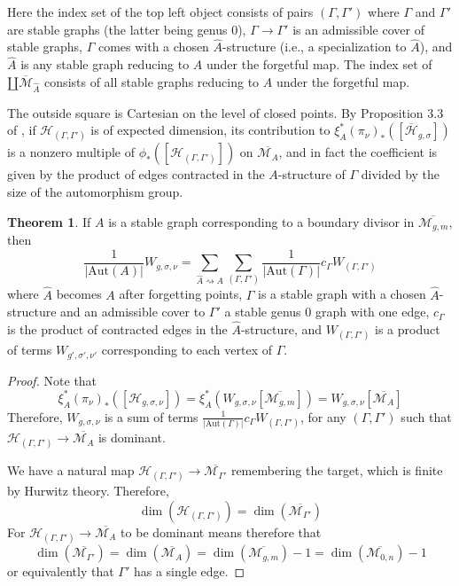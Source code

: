 \documentclass[11pt]{article}           %
\newcommand{\Aut}{\text{Aut}}
\newcommand{\Hb}{\overline{\mathcal H}}
\theoremstyle{definition}
\newtheorem{thm}{Theorem}[section]
\begin{document}
Here the index set of the top left object
consists of pairs $(\Gamma,\Gamma')$
where $\Gamma$ and $\Gamma'$ are stable graphs (the latter being genus $0$), $\Gamma\to\Gamma'$ is an admissible cover of stable graphs, $\Gamma$
comes with a chosen $\hat A$-structure (i.e., a specialization to $\hat A$),
and $\hat A$ is any stable graph reducing to $A$ under the forgetful map.
The index set of $\amalg\overline{\mathcal M}_{\hat A}$ consists of
all stable graphs reducing to $A$ under the forgetful map.

The outside square is Cartesian on the level of closed points. By
Proposition 3.3 of \cite{Lian}, if $\mathcal H_{(\Gamma,\Gamma')}$ is of
expected dimension, its contribution to $\xi_A^*(\pi_{\nu})_*([\Hb_{g,\sigma}])$
is a nonzero multiple of $\phi_*([\mathcal H_{(\Gamma,\Gamma')}])$ on $\overline{\mathcal M_A}$, and in fact the coefficient is given by the product of edges contracted in the $A$-structure of $\Gamma$ divided by the size of the automorphism group.%

\begin{thm}
  \label{thm:admissible}
  If $A$ is a stable graph corresponding to a boundary divisor in $\overline{\mathcal M_{g,m}}$, then
  \[
  \frac 1{|\Aut(A)|}W_{g,\sigma,\nu}=\sum_{\hat A\rightsquigarrow A}\sum_{(\Gamma,\Gamma')}\frac 1{|\Aut(\Gamma)|}c_{\Gamma}W_{(\Gamma,\Gamma')}
  \]
  where $\hat A$ becomes $A$ after forgetting points, $\Gamma$ is a stable graph with a chosen $\hat A$-structure and an admissible
  cover to $\Gamma'$ a stable genus $0$ graph with one edge, $c_{\Gamma}$ is the
  product of contracted edges in the $\hat A$-structure, and
  $W_{(\Gamma,\Gamma')}$ is a product of terms $W_{g',\sigma',\nu'}$ corresponding to each vertex of $\Gamma$.
\end{thm}

\begin{proof}
  Note that
  \[
  \xi_A^*(\pi_{\nu})_*([\mathcal H_{g,\sigma,\nu}]) =
  \xi_A^*(W_{g,\sigma,\nu}[\overline{\mathcal M_{g,m}}])=
  W_{g,\sigma,\nu}[\overline{\mathcal M_A}]
  \]
  Therefore, $W_{g,\sigma,\nu}$ is a sum of
  terms $\frac 1{|\Aut(\Gamma)|}c_{\Gamma}W_{(\Gamma,\Gamma')}$, for
  any $(\Gamma,\Gamma')$ such that
  $\mathcal H_{(\Gamma,\Gamma')}\to\overline{\mathcal M_A}$
  is dominant.

  We have a natural map $\mathcal H_{(\Gamma,\Gamma')}\to \overline{\mathcal M_{\Gamma'}}$ remembering the target, which is finite by Hurwitz theory. Therefore,
  \[
  \dim(\mathcal H_{(\Gamma,\Gamma')})=\dim(\overline{\mathcal M_{\Gamma'}})
  \]
  For $\mathcal H_{(\Gamma,\Gamma')}\to\overline{\mathcal M_A}$ to be
  dominant means therefore that
  \[
  \dim(\overline{\mathcal M_{\Gamma'}})=\dim(\overline{\mathcal M_A})=
  \dim(\overline{\mathcal M_{g,m}})-1=\dim(\overline{\mathcal M_{0,n}})-1
  \]
  or equivalently that $\Gamma'$ has a single edge.
\end{proof}
\end{document}
